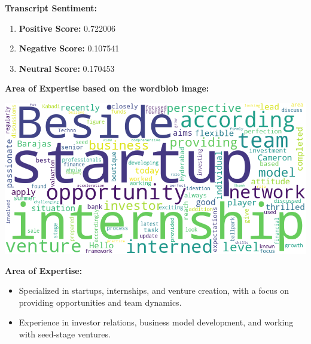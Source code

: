 \documentclass{article}
\begin{document}
\large{\textbf{Transcript Sentiment:}}
\begin{tcolorbox}[colback=blue!5!white,colframe=blue!75!black, fonttitle=\bfseries, title=Sentiment Breakdown]
    \begin{enumerate}
        \item \textbf{Positive Score:} \textcolor{green!70!black}{0.722006}
        \item \textbf{Negative Score:} \textcolor{red!70!black}{0.107541}
        \item \textbf{Neutral Score:} \textcolor{blue!70!black}{0.170453}
    \end{enumerate}

\end{tcolorbox}
\vspace{0.3in}
\LARGE \textbf{Area of Expertise based on the wordblob image:} \normalsize
\begin{center}
    \includegraphics[width=1\columnwidth]{images/wordcloud_2.png}
\end{center}
\vspace{0.1in}
\LARGE \textbf{Area of Expertise:} \normalsize
\begin{itemize} \item Specialized in startups, internships, and venture creation, with a focus on providing opportunities and team dynamics. \item Experience in investor relations, business model development, and working with seed-stage ventures. \end{itemize}
\end{document}
